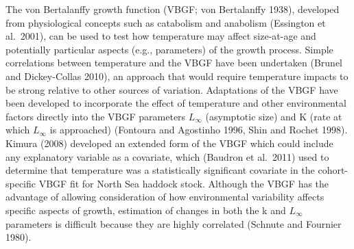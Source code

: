 \documentclass[
]{article}
\begin{document}
The von Bertalanffy growth function (VBGF; von Bertalanffy 1938),
developed from physiological concepts such as catabolism and anabolism
(Essington et al.~2001), can be used to test how temperature may affect
size-at-age and potentially particular aspects (e.g., parameters) of the
growth process. Simple correlations between temperature and the VBGF
have been undertaken (Brunel and Dickey-Collas 2010), an approach that
would require temperature impacts to be strong relative to other sources
of variation. Adaptations of the VBGF have been developed to incorporate
the effect of temperature and other environmental factors directly into
the VBGF parameters \(L_\infty\) (asymptotic size) and K (rate at which
\(L_\infty\) is approached) (Fontoura and Agostinho 1996, Shin and
Rochet 1998). Kimura (2008) developed an extended form of the VBGF which
could include any explanatory variable as a covariate, which (Baudron et
al.~2011) used to determine that temperature was a statistically
significant covariate in the cohort-specific VBGF fit for North Sea
haddock stock. Although the VBGF has the advantage of allowing
consideration of how environmental variability affects specific aspects
of growth, estimation of changes in both the k and \(L_\infty\)
parameters is difficult because they are highly correlated (Schnute and
Fournier 1980).
\end{document}
